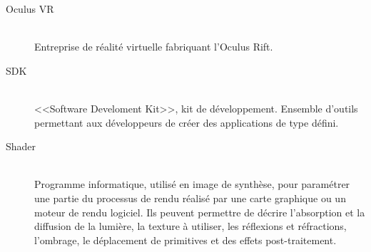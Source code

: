 \documentclass[a4paper,french,12pt]{article}
\begin{document}
\begin{description}
		 \item [Oculus VR]~\\
		    Entreprise de réalité virtuelle fabriquant l'Oculus Rift.
		    
		 
		 \item [SDK]~\\
		    <<Software Develoment Kit>>, kit de développement. 
		    Ensemble d'outils permettant aux développeurs de créer des applications de type défini.
		    
		 \item [Shader]~\\
		     Programme informatique, utilisé en image de synthèse, 
		     pour paramétrer une partie du processus de rendu réalisé par une carte graphique ou un moteur de rendu logiciel.
		     Ils peuvent permettre de décrire l'absorption et la diffusion de la lumière, la texture à utiliser, 
		     les réflexions et réfractions, l'ombrage, le déplacement de primitives 
		     et des effets post-traitement. 

		\end{description}

		
\end{document}
